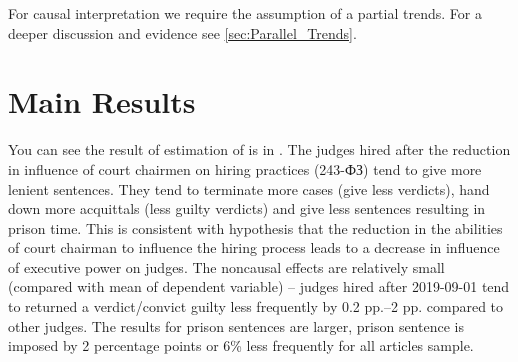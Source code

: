 \documentclass[12pt]{article}
\numberwithin{equation}{section}
\numberwithin{table}{section}
\numberwithin{figure}{section}
\begin{document}
For causal interpretation we require the assumption of a partial trends. For a deeper discussion and evidence see \vref{sec:Parallel_Trends}.


\section{Main Results}

You can see the result of estimation of  is in . 
The judges hired after the reduction in influence of court chairmen on hiring practices (243-ФЗ) tend to give more lenient sentences. 
They tend to terminate more cases (give less verdicts), hand down more acquittals (less guilty verdicts) and give less sentences resulting in prison time.
This is consistent with hypothesis that the reduction in the abilities of court chairman to influence the hiring process leads to a decrease in influence of executive power on judges.
The noncausal effects are relatively small (compared with mean of dependent variable) -- judges hired after 2019-09-01 tend to returned a verdict/convict guilty less frequently by 0.2 pp.--2 pp. compared to other judges.  
The results for prison sentences are larger, prison sentence is imposed by 2 percentage points or 6\% less frequently for all articles sample.
\end{document}
